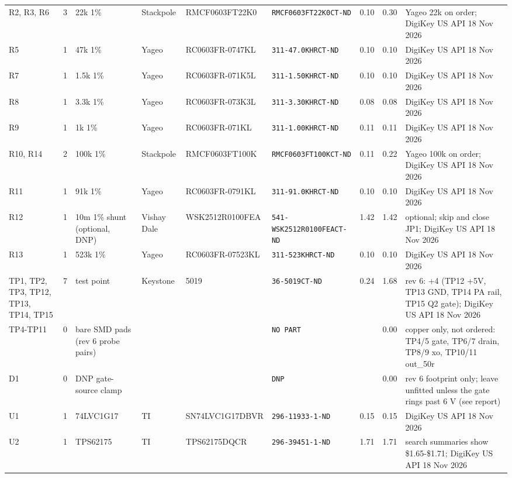 \begin{longtable}{@{}p{1.8cm}r >{\raggedright\arraybackslash}p{2.3cm} >{\raggedright\arraybackslash}p{1.9cm} p{3.7cm} p{4.4cm} r r >{\raggedright\arraybackslash}p{3.9cm}@{}}
R2, R3, R6 & 3 & 22k 1\% & Stackpole & RMCF0603FT22K0 & \texttt{\footnotesize RMCF0603FT22K0CT-ND} & 0.10 & 0.30 & Yageo 22k on order; DigiKey US API 18 Nov 2026\\
R5 & 1 & 47k 1\% & Yageo & RC0603FR-0747KL & \texttt{\footnotesize 311-47.0KHRCT-ND} & 0.10 & 0.10 & DigiKey US API 18 Nov 2026\\
R7 & 1 & 1.5k 1\% & Yageo & RC0603FR-071K5L & \texttt{\footnotesize 311-1.50KHRCT-ND} & 0.10 & 0.10 & DigiKey US API 18 Nov 2026\\
R8 & 1 & 3.3k 1\% & Yageo & RC0603FR-073K3L & \texttt{\footnotesize 311-3.30KHRCT-ND} & 0.08 & 0.08 & DigiKey US API 18 Nov 2026\\
R9 & 1 & 1k 1\% & Yageo & RC0603FR-071KL & \texttt{\footnotesize 311-1.00KHRCT-ND} & 0.11 & 0.11 & DigiKey US API 18 Nov 2026\\
R10, R14 & 2 & 100k 1\% & Stackpole & RMCF0603FT100K & \texttt{\footnotesize RMCF0603FT100KCT-ND} & 0.11 & 0.22 & Yageo 100k on order; DigiKey US API 18 Nov 2026\\
R11 & 1 & 91k 1\% & Yageo & RC0603FR-0791KL & \texttt{\footnotesize 311-91.0KHRCT-ND} & 0.10 & 0.10 & DigiKey US API 18 Nov 2026\\
R12 & 1 & 10m 1\% shunt (optional, DNP) & Vishay Dale & WSK2512R0100FEA & \texttt{\footnotesize 541-WSK2512R0100FEACT-ND} & 1.42 & 1.42 & optional; skip and close JP1; DigiKey US API 18 Nov 2026\\
R13 & 1 & 523k 1\% & Yageo & RC0603FR-07523KL & \texttt{\footnotesize 311-523KHRCT-ND} & 0.10 & 0.10 & DigiKey US API 18 Nov 2026\\
TP1, TP2, TP3, TP12, TP13, TP14, TP15 & 7 & test point & Keystone & 5019 & \texttt{\footnotesize 36-5019CT-ND} & 0.24 & 1.68 & rev 6: +4 (TP12 +5V, TP13 GND, TP14 PA rail, TP15 Q2 gate); DigiKey US API 18 Nov 2026\\
TP4-TP11 & 0 & bare SMD pads (rev 6 probe pairs) &  &  & \texttt{\footnotesize NO PART} &  & 0.00 & copper only, not ordered: TP4/5 gate, TP6/7 drain, TP8/9 xo, TP10/11 out\_\allowbreak{}50r\\
D1 & 0 & DNP gate-source clamp &  &  & \texttt{\footnotesize DNP} &  & 0.00 & rev 6 footprint only; leave unfitted unless the gate rings past 6 V (see report)\\
U1 & 1 & 74LVC1G17 & TI & SN74LVC1G17DBVR & \texttt{\footnotesize 296-11933-1-ND} & 0.15 & 0.15 & DigiKey US API 18 Nov 2026\\
U2 & 1 & TPS62175 & TI & TPS62175DQCR & \texttt{\footnotesize 296-39451-1-ND} & 1.71 & 1.71 & search summaries show \$1.65-\$1.71; DigiKey US API 18 Nov 2026\\

\end{longtable}
